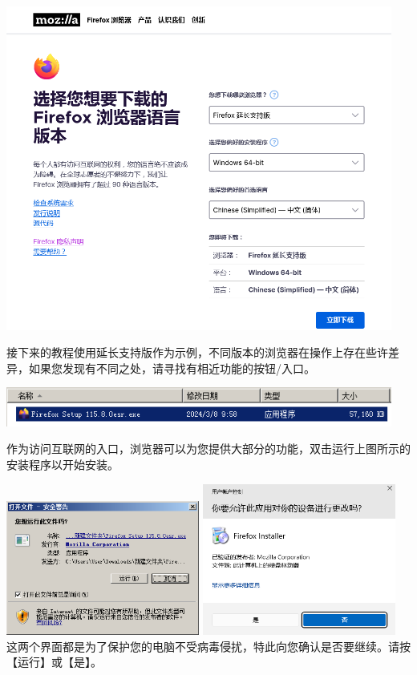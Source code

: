 \includegraphics[width=5in]{media/image2.png}

接下来的教程使用延长支持版作为示例，不同版本的浏览器在操作上存在些许差异，如果您发现有不同之处，请寻找有相近功能的按钮/入口。

\includegraphics[width=5in]{media/image3.png}

作为访问互联网的入口，浏览器可以为您提供大部分的功能，双击运行上图所示的安装程序以开始安装。

\includegraphics[width=2.5in]{media/image4.png}
\includegraphics[width=2.5in]{media/windows-uac-dialog-win11.png} \\
这两个界面都是为了保护您的电脑不受病毒侵扰，特此向您确认是否要继续。请按【运行】或【是】。

